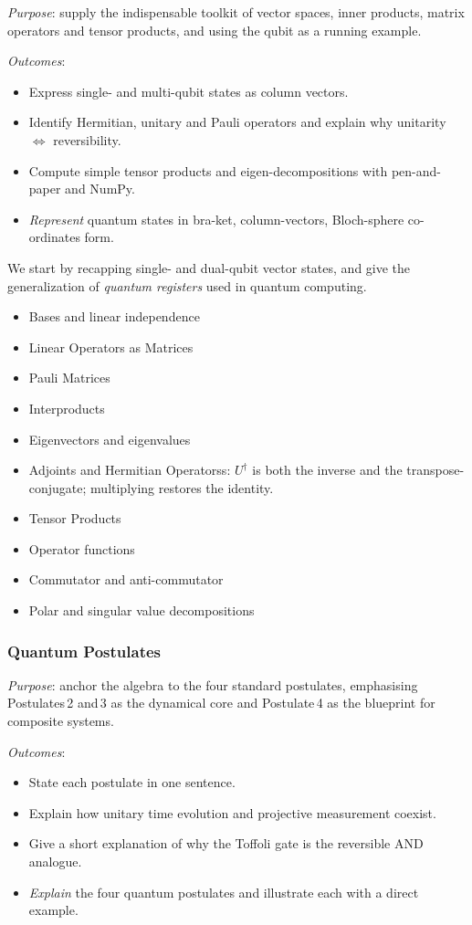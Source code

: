 \emph{Purpose}: supply the indispensable toolkit of vector spaces, inner products, matrix operators and tensor products,
and using the qubit as a running example.

\emph{Outcomes}:
\begin{itemize}
	\item Express single- and multi-qubit states as column vectors.
	\item Identify Hermitian, unitary and Pauli operators and explain why unitarity $\iff$ reversibility.
	\item Compute simple tensor products and eigen-decompositions with pen-and-paper and NumPy.
	\item \emph{Represent} quantum states in bra-ket, column-vectors, Bloch-sphere co-ordinates form.
\end{itemize}

We start by recapping single- and dual-qubit vector states, 
and give the generalization of \emph{quantum registers} used in quantum computing. 

\begin{itemize}
	\item Bases and linear independence
	\item Linear Operators as Matrices
	\item Pauli Matrices
	\item Interproducts
	\item Eigenvectors and eigenvalues
	\item Adjoints and Hermitian Operatorss:  $U^{\dagger}$ is both the inverse and the transpose-conjugate; multiplying restores  the identity. 
	\item Tensor Products
	\item Operator functions
	\item Commutator and anti-commutator
	\item Polar and singular value decompositions
\end{itemize}

\subsubsection*{Quantum Postulates}

\emph{Purpose}: anchor the algebra to the four standard postulates, 
emphasising Postulates 2 and 3 as the dynamical core and Postulate 4 as the blueprint for composite systems.

\emph{Outcomes}:
\begin{itemize}
	\item State each postulate in one sentence.
	\item Explain how unitary time evolution and projective measurement coexist.
	\item Give a short explanation of why the Toffoli gate is the reversible AND analogue.
	\item \emph{Explain} the four quantum postulates and illustrate each with a direct example.
\end{itemize}


